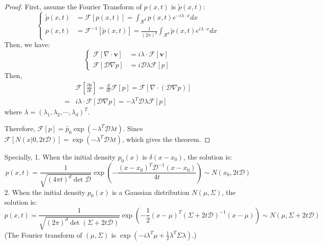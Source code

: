 \begin{proof}
    First, assume the Fourier Transform of $p(x, t)$ is $\tilde{p}(x, t)$:
    \begin{equation}\left\{
        \begin{aligned}
            \tilde{p}(x, t) &= \mathscr{F}\left[p(x, t)\right]=\int_{\mathcal{R}^d} p(x, t)e^{-i\lambda\cdot x}dx\\
            p(x, t) &= \mathscr{F}^{-1}\left[\tilde{p}(x, t)\right]=\frac{1}{(2\pi)^d}\int_{\mathcal{R}^d} \tilde{p}(x, t)e^{i\lambda\cdot x}dx
        \end{aligned}\right.
    \end{equation} 
    Then, we have:
    \begin{equation}\left\{
        \begin{aligned}
            \mathscr{F}\left[\nabla\cdot \mathbf{v}\right] &= i\lambda\cdot \mathscr{F}\left[\mathbf{v}\right]\\
            \mathscr{F}\left[\mathcal{D}\nabla p\right] &= i\mathcal{D}\lambda\mathscr{F}\left[p\right]
        \end{aligned}\right.
    \end{equation}
    Then, 
    \begin{equation}
        \begin{aligned}
            &\mathscr{F}\left[\frac{\partial p}{\partial t}\right] = \frac{d}{dt}\mathscr{F}\left[p\right] = \mathscr{F}\left[\nabla\cdot\left(\mathcal{D}\nabla p\right)\right] \\
            =& i\lambda\cdot \mathscr{F}\left[\mathcal{D}\nabla p\right]=-\lambda^T\mathcal{D}\lambda \mathscr{F}\left[p\right]
        \end{aligned}
    \end{equation}
    where $\lambda = \left(\lambda_1, \lambda_2, \cdots, \lambda_d\right)^T$. 

    Therefore, $\mathscr{F}\left[p\right] = \tilde{p_0}\exp\left(-\lambda^T\mathcal{D}\lambda t\right)$. 
    Since $\mathscr{F}\left[N(x|0, 2t\mathcal{D})\right]=\exp\left(-\lambda^T\mathcal{D}\lambda t\right)$, which gives the theorem.
\end{proof}

\begin{remark}
    Specially, 1. When the initial density $p_0(x)$ is $\delta(x - x_0)$, the solution is:
\begin{equation}
    p(x, t) = \frac{1}{\sqrt{(4\pi t)^d\det{\mathcal{D}}}}\exp\left(-\frac{(x-x_0)^T\mathcal{D}^{-1}(x-x_0)}{4t}\right)\sim N(x_0, 2t\mathcal{D})
\end{equation}
2. When the initial density $p_0(x)$ is a Gaussian distribution $N(\mu, \Sigma)$, the solution is:
\begin{equation}
    p(x, t) = \frac{1}{\sqrt{(2\pi)^d\det(\Sigma + 2t\mathcal{D})}}\exp\left(-\frac{1}{2}\left(x-\mu\right)^T\left(\Sigma + 2t\mathcal{D}\right)^{-1}\left(x-\mu\right)\right)\sim N(\mu, \Sigma + 2t\mathcal{D})
\end{equation}
(The Fourier transform of $\left(\mu, \Sigma \right)$ is $\exp \left(-i\lambda^T\mu + \frac{1}{2}\lambda^T\Sigma\lambda\right)$.)
\end{remark}

